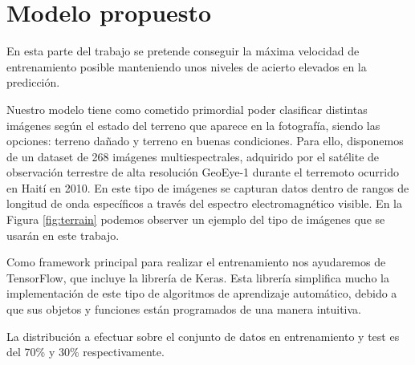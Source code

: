 \section{Modelo propuesto}\label{sec:modelo-propuesto}
En esta parte del trabajo se pretende conseguir la máxima velocidad de entrenamiento posible manteniendo unos niveles de acierto elevados en la predicción.

Nuestro modelo \cite{paper_project} tiene como cometido primordial poder clasificar distintas imágenes según el estado del terreno que aparece en la fotografía, siendo las opciones: terreno dañado y terreno en buenas condiciones. Para ello, disponemos de un dataset de 268 imágenes multiespectrales, adquirido por el satélite de observación terrestre de alta resolución GeoEye-1 durante el terremoto ocurrido en Haití en 2010. En este tipo de imágenes se capturan datos dentro de rangos de longitud de onda específicos a través del espectro electromagnético visible. En la Figura \ref{fig:terrain} podemos observer un ejemplo del tipo de imágenes que se usarán en este trabajo.



Como framework principal para realizar el entrenamiento nos ayudaremos de TensorFlow, que incluye la librería de  Keras. Esta librería simplifica mucho la implementación de este tipo de algoritmos de aprendizaje automático, debido a que sus objetos y funciones están programados de una manera intuitiva.

La distribución a efectuar sobre el conjunto de datos en entrenamiento y test es del 70\% y 30\% respectivamente.

